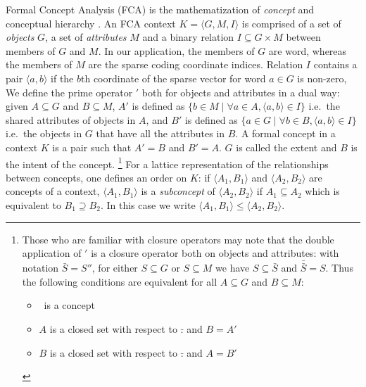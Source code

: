 \documentclass[11pt,a4paper]{article}
\begin{document}
Formal Concept Analysis (FCA) is the mathematization of \emph{concept} and conceptual
hierarchy \citep{Ganter:1999,Endres:2008}. %
An FCA context $K = \langle G, M, I\rangle$ is comprised of
a set of \emph{objects} $G$, a set of \emph{attributes} $M$ and
a binary relation $I \subseteq G \times M$ between members of $G$ and $M$.
In our application, the members of $G$ are word, whereas
the members of $M$ are the sparse coding coordinate indices.
Relation $I$ contains a pair $\langle a, b\rangle$
if the $b$th coordinate of the sparse vector for word $a \in G$ is non-zero,
We define the prime operator $'$ both for objects and attributes in a dual way:
given $A\subseteq G$ and $B \subseteq M$,
$A'$ is defined as $\{ b\in M\mid \forall a\in A, \langle a,b \rangle \in I\}$
i.e.~the shared attributes of objects in $A$, and
$B'$ is defined as $\{ a\in G\mid \forall b\in B, \langle a,b \rangle \in I\}$
i.e.~the objects in $G$ that have all the attributes in $B$.
A formal concept in a context $K$ is a pair \abconc
such that $A' = B$ and $B' = A$.
$G$ is called the extent and $B$ is the intent of the concept.
\footnote{
  Those who are familiar with closure operators may note that the double
  application of $'$ is a closure operator both on objects and attributes: with
  notation $\bar S=S''$, for either $S\subseteq G$ or $S\subseteq M$ we have
  $S\subseteq \bar S$ and $\bar{\bar S}=S$. Thus the following conditions are
  equivalent for all $A\subseteq G$ and $B\subseteq M$:
  \begin{itemize}
    \item \abconc~is a concept
    \item $A$ is a closed set with respect to $\bar .$
      and $B=A'$
    \item $B$ is a closed set with respect to $\bar .$ and $A=B'$
  \end{itemize}
}
For a lattice representation of the relationships between concepts, one defines
an order on $K$:
if $\langle A_1 , B_1 \rangle$ and $\langle A_2 , B_2 \rangle$ are concepts of
a context, $\langle A_1 , B_1 \rangle$ is a \emph{subconcept} of $\langle A_2 , B_2
\rangle$ if $A_1 \subseteq A_2 $ which is equivalent to $B_1 \supseteq B_2 $.  In this case
we write $\langle A_1 , B_1 \rangle \le \langle A_2 , B_2 \rangle$.
\end{document}
